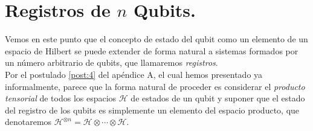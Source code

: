 \documentclass[11pt, spanish]{report}
\numberwithin{equation}{section}
\numberwithin{defin}{section}
\begin{document}
%
%

%
%
%

\section{Registros de \texorpdfstring{$n$}{n} Qubits.} \label{regNQubits} 

Vemos en este punto que el concepto de estado del qubit como un elemento de un espacio de Hilbert se puede extender de forma natural a sistemas formados por un número arbitrario de qubits, que llamaremos \emph{registros}.\\

Por el postulado \ref{post:4} del apéndice A, el cual hemos presentado ya informalmente, parece que la forma natural de proceder es considerar el \emph{producto tensorial} de todos los espacios $\mathcal{H}$ de estados de un qubit y suponer que el estado del registro de los qubits es simplemente un elemento del espacio producto, que denotaremos $\mathcal{H}^{\otimes n}=\mathcal{H}\otimes\cdots\otimes \mathcal{H}$.\\
\end{document}
